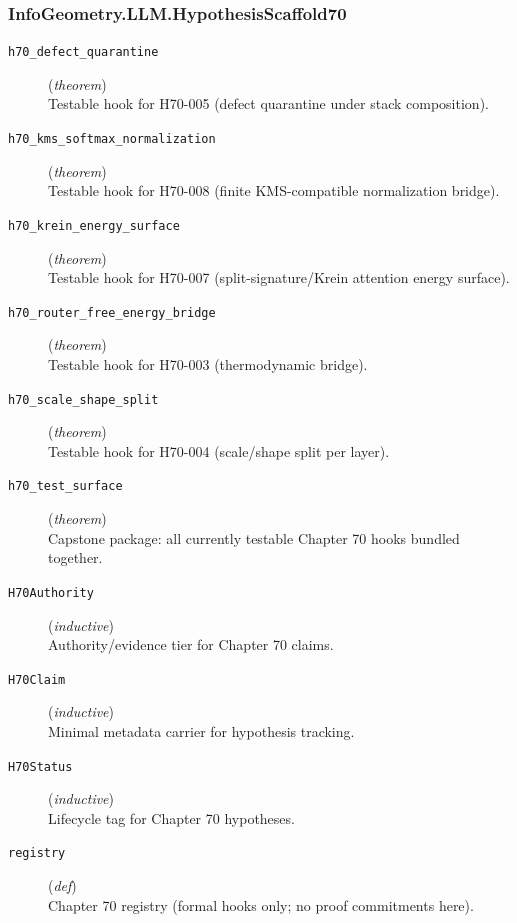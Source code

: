 \documentclass[11pt,a4paper]{article}
\begin{document}
\subsubsection*{InfoGeometry.LLM.HypothesisScaffold70}
\begin{description}
  \item[\texttt{h70\_defect\_quarantine}] (\textit{theorem}) \\ Testable hook for H70-005 (defect quarantine under stack composition).
  \item[\texttt{h70\_kms\_softmax\_normalization}] (\textit{theorem}) \\ Testable hook for H70-008 (finite KMS-compatible normalization bridge).
  \item[\texttt{h70\_krein\_energy\_surface}] (\textit{theorem}) \\ Testable hook for H70-007 (split-signature/Krein attention energy surface).
  \item[\texttt{h70\_router\_free\_energy\_bridge}] (\textit{theorem}) \\ Testable hook for H70-003 (thermodynamic bridge).
  \item[\texttt{h70\_scale\_shape\_split}] (\textit{theorem}) \\ Testable hook for H70-004 (scale/shape split per layer).
  \item[\texttt{h70\_test\_surface}] (\textit{theorem}) \\ Capstone package: all currently testable Chapter 70 hooks bundled together.
  \item[\texttt{H70Authority}] (\textit{inductive}) \\ Authority/evidence tier for Chapter 70 claims.
  \item[\texttt{H70Claim}] (\textit{inductive}) \\ Minimal metadata carrier for hypothesis tracking.
  \item[\texttt{H70Status}] (\textit{inductive}) \\ Lifecycle tag for Chapter 70 hypotheses.
  \item[\texttt{registry}] (\textit{def}) \\ Chapter 70 registry (formal hooks only; no proof commitments here).
\end{description}
\end{document}
